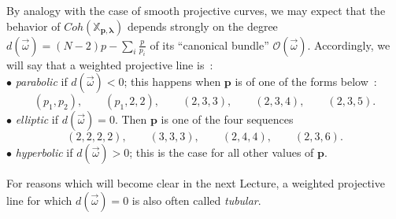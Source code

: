 \documentclass[a4paper,10pt]{amsart}
\def\O{\mathcal{O}}
\def\p{\mathbf{p}}
\def\xpl{\mathbb{X}_{\mathbf{p},\boldsymbol{\lambda}}}
\numberwithin{equation}{section}
\begin{document}
{\vspace{.15in}

By analogy with the case of smooth projective curves, we may expect that the behavior of $Coh(\xpl)$ depends strongly on the degree $d(\vec{\omega})=(N-2)p-\sum_i \frac{p}{p_i}$ of its ``canonical bundle'' $\O(\vec{\omega})$. Accordingly, we will say that a weighted projective line is~:\\
$\bullet$ \textit{parabolic} if $d(\vec{\omega})<0$; this happens when $\p$ is of one of the forms below~:
\begin{equation}\label{E:parabolictype}
(p_1,p_2), \qquad (p_1,2,2), \qquad (2,3,3), \qquad (2,3,4), \qquad (2,3,5).
\end{equation}
$\bullet$ \textit{elliptic} if $d(\vec{\omega})=0$. Then $\p$ is one of the four sequences
\begin{equation}\label{E:elliptictype}
(2,2,2,2), \qquad (3,3,3), \qquad (2,4,4), \qquad (2,3,6).
\end{equation}
$\bullet$ \textit{hyperbolic} if $d(\vec{\omega})>0$; this is the case for all other values of $\p$.

\vspace{.1in}

For reasons which will become clear in the next Lecture, a weighted projective line for which $d(\vec{\omega})=0$ is also often called \textit{tubular}.

\vspace{.15in}

}
\end{document}
